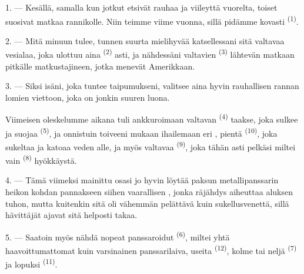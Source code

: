%

\VUsaut{4.0mm}
\VUsaut{3.0mm}
\VUsaut{3.0mm}

1. --- Kesällä, samalla kun jotkut etsivät rauhaa ja viileyttä vuorelta, toiset
suosivat matkaa rannikolle. Niin teimme viime vuonna, sillä pidämme kovasti
 \textsuperscript{(1)}.

2. --- Mitä minuun tulee, tunnen suurta mielihyvää katsellessani sitä valtavaa
vesialaa, joka ulottuu aina  \textsuperscript{(2)} asti,
ja nähdessäni valtavien  \textsuperscript{(3)} lähtevän
matkaan pitkälle  matkustajineen, jotka menevät Amerikkaan.

3. --- Siksi isäni, joka tuntee taipumukseni, valitsee aina hyvin rauhallisen
rannan lomien viettoon, joka on jonkin suuren  luona.

Viimeisen oleskelumme aikana  tuli ankkuroimaan valtavan
 \textsuperscript{(4)} taakse, joka sulkee ja suojaa
 \textsuperscript{(5)}, ja onnistuin toiveeni mukaan
ihailemaan eri , pientä 
\textsuperscript{(10)}, joka sukeltaa ja katoaa veden alle, ja myös valtavaa
 \textsuperscript{(9)}, joka tähän asti pelkäsi miltei
vain  \textsuperscript{(8)} hyökkäystä.

\VUsaut{3.0mm}
\VUsaut{3.0mm}

4. --- Tämä viimeksi mainittu osasi jo hyvin  löytää
paksun metallipanssarin heikon kohdan pannakseen siihen vaarallisen
, jonka räjähdys aiheuttaa aluksen tuhon, mutta kuitenkin sitä
oli vähemmän pelättävä kuin sukellusvenettä, sillä hävittäjät ajavat sitä
helposti takaa.

5. --- Saatoin myös nähdä nopeat panssaroidut 
\textsuperscript{(6)}, miltei yhtä haavoittumattomat kuin varsinainen
panssarilaiva, useita  \textsuperscript{(12)}, kolme tai
neljä  \textsuperscript{(7)} ja lopuksi 
\textsuperscript{(11)}. 

